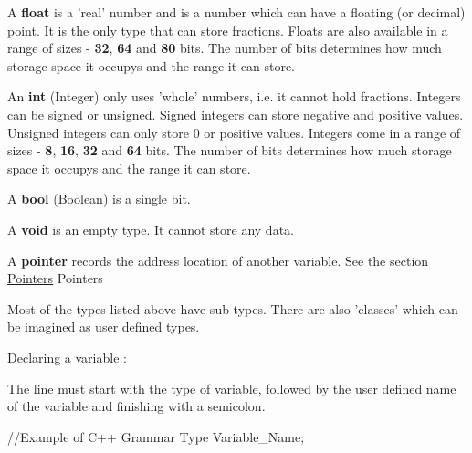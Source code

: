 \begin{DoxyItemize}
\item A {\bfseries float} is a 'real' number and is a number which can have a floating (or decimal) point. It is the only type that can store fractions. Floats are also available in a range of sizes -\/ {\bfseries 32}, {\bfseries 64} and {\bfseries 80} bits. The number of bits determines how much storage space it occupys and the range it can store.
\item An {\bfseries int} (Integer) only uses 'whole' numbers, i.e. it cannot hold fractions. Integers can be signed or unsigned. Signed integers can store negative and positive values. Unsigned integers can only store 0 or positive values. Integers come in a range of sizes -\/ {\bfseries 8}, {\bfseries 16}, {\bfseries 32} and {\bfseries 64} bits. The number of bits determines how much storage space it occupys and the range it can store.
\item A {\bfseries bool} (Boolean) is a single bit.
\item A {\bfseries void} is an empty type. It cannot store any data.
\item A {\bfseries pointer} records the address location of another variable. See the section \hyperlink{_programming_basics_BasicsPagePointers}{Pointers} Pointers
\item Most of the types listed above have sub types. There are also 'classes' which can be imagined as user defined types.
\end{DoxyItemize}Declaring a variable : \par
 The line must start with the type of variable, followed by the user defined name of the variable and finishing with a semicolon. 
\begin{DoxyCode}
 //Example of C++ Grammar
 Type Variable_Name;
\end{DoxyCode}



